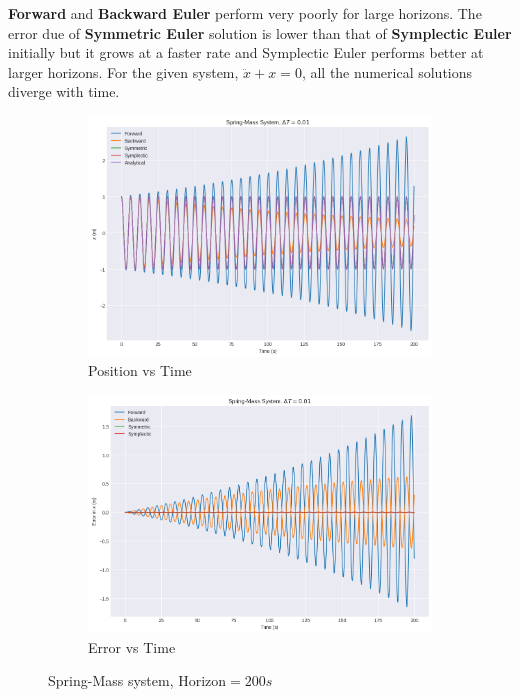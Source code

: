 \documentclass[11pt]{article}
\begin{document}
 \textbf{Forward} and \textbf{Backward Euler} perform very poorly for large horizons. The 
 error due of \textbf{Symmetric Euler} solution is lower than that of \textbf{Symplectic Euler} initially but 
 it grows at a faster rate and Symplectic Euler performs better at larger horizons.
For the given system, $\ddot{x} + x = 0$, all the numerical solutions diverge with time.
\begin{figure}[H]
    \centering
    \begin{subfigure}[H]{0.49\linewidth}
      \includegraphics[width=\linewidth]{../sm9.png}
      \caption*{Position vs Time}
    \end{subfigure}
    \begin{subfigure}[H]{0.49\linewidth}
      \includegraphics[width=\linewidth]{../sm10.png}
      \caption*{Error vs Time}
    \end{subfigure}
    \caption*{Spring-Mass system, Horizon$ = 200s$}
  \end{figure}
\end{document}
